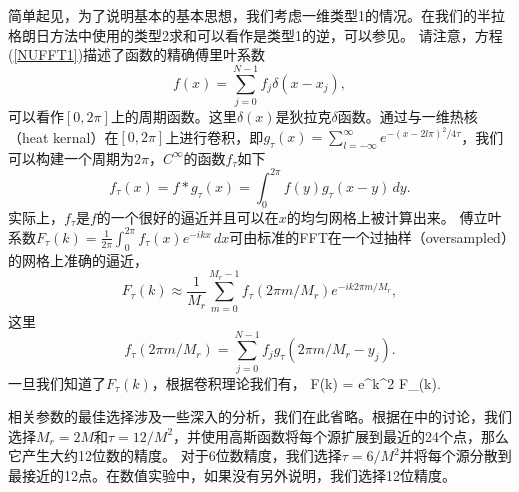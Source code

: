 简单起见，为了说明基本的基本思想，我们考虑一维类型1的情况。在我们的半拉格朗日方法中使用的类型2求和可以看作是类型1的逆，可以参见。 请注意，方程(\ref{NUFFT1})描述了函数的精确傅里叶系数
\begin{equation}\label{delta}
f(x)=\sum_{j=0}^{N-1}f_j\delta(x-x_j),
\end{equation}
可以看作$[0,2\pi]$上的周期函数。这里$\delta(x)$是狄拉克$\delta$函数。通过与一维热核（heat kernal）在$[0,2\pi]$上进行卷积，即$g_\tau(x)=\sum_{l=-\infty}^\infty e^{-(x-2l\pi)^2/4\tau}$，我们可以构建一个周期为$2\pi$，$C^{\infty}$的函数$f_{\tau}$如下
\begin{equation}
f_\tau(x)=f*g_\tau(x)=\int_0^{2\pi}f(y)g_\tau(x-y)\,dy.
\end{equation}
实际上，$f_\tau$是$f$的一个很好的逼近并且可以在$x$的均匀网格上被计算出来。
傅立叶系数$F_\tau(k)=\frac{1}{2\pi}\int_0^{2\pi}f_\tau(x)e^{-i kx}\,dx$可由标准的FFT在一个过抽样（oversampled）的网格上准确的逼近，
\begin{equation}\label{sFFT}
F_\tau(k)\approx\frac{1}{M_r}\sum_{m=0}^{M_r-1}f_\tau(2\pi m/M_r)e^{-ik2\pi m/M_r},
\end{equation}
这里
\begin{equation}\label{conv}
f_\tau(2\pi m/M_r)=\sum_{j=0}^{N-1}f_j g_\tau(2\pi m/M_r-y_j).
\end{equation}
一旦我们知道了$F_\tau(k)$，根据卷积理论我们有， 
\bea
F(k) = \sqrt{\frac{\pi}{\tau}} e^{k^2 \tau} F_\tau(k).
\eea

相关参数的最佳选择涉及一些深入的分析，我们在此省略。根据在中的讨论，我们选择$M_r = 2M$和$\tau = 12 / M^2$，并使用高斯函数将每个源扩展到最近的24个点，那么它产生大约12位数的精度。
对于6位数精度，我们选择$\tau = 6 / M^2$并将每个源分散到最接近的12点。在数值实验中，如果没有另外说明，我们选择12位精度。

